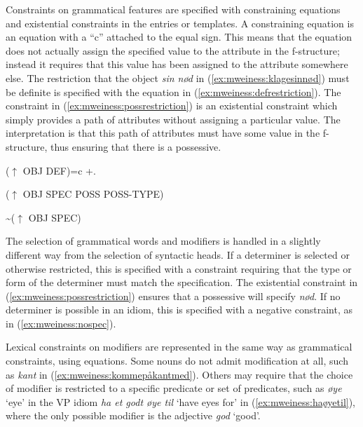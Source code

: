 \documentclass[output=paper]{langsci/langscibook}
\begin{document}

Constraints on grammatical features are specified with constraining equations and existential constraints in the entries or templates.
A constraining equation is an equation with a ``c'' attached to the equal sign.
This means that the equation does not actually assign the specified value to the attribute in the f-structure; instead it requires that this value has been assigned to the attribute somewhere else.
The restriction that the object \emph{sin nød} in (\ref{ex:mweiness:klagesinnød}) must be definite is specified with the equation in (\ref{ex:mweiness:defrestriction}).
The constraint in (\ref{ex:mweiness:possrestriction}) is an existential constraint which simply provides  a path of attributes without assigning a particular value.
The interpretation is that this path of attributes must have some value in the f-structure, thus ensuring that there is a possessive.

\ea\label{ex:mweiness:defrestriction}
{\small 
($\uparrow$ OBJ DEF)=c +.
}
\z

\ea\label{ex:mweiness:possrestriction}
{\small 
($\uparrow$ OBJ SPEC POSS POSS-TYPE) \\
}
\z


\ea\label{ex:mweiness:nospec}
{\small 
{\textasciitilde}($\uparrow$ OBJ SPEC) \\
}
\z

The selection of grammatical words and modifiers is handled in a slightly different way from the selection of syntactic heads.
If a determiner is selected or otherwise restricted, this is specified with a constraint requiring that the type or form of the determiner must match the specification.
The existential constraint in (\ref{ex:mweiness:possrestriction}) ensures that a possessive will specify \emph{nød}.
If no determiner is possible in an idiom, this is specified with a negative constraint, as in (\ref{ex:mweiness:nospec}).

Lexical constraints on modifiers are represented in the same way as grammatical constraints, using equations. 
Some nouns do not admit modification at all, such as \emph{kant} in (\ref{ex:mweiness:kommepåkantmed}).
Others may require that the choice of modifier is restricted to a specific predicate or set of predicates, such as \textit{øye} `eye' in the VP idiom \emph{ha et godt øye til} `have eyes for' in (\ref{ex:mweiness:haøyetil}), where the only possible modifier is the adjective \emph{god} `good'.
\end{document}
